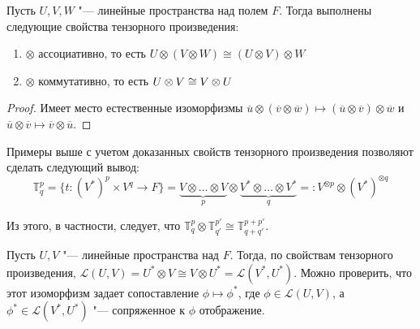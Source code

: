 \begin{proposition}
	Пусть $U, V, W$ "--- линейные пространства над полем $F$. Тогда выполнены следующие свойства тензорного произведения:
	\begin{enumerate}
		\item $\otimes$ ассоциативно, то есть $U \otimes (V \otimes W) \cong (U \otimes V) \otimes W$
		\item $\otimes$ коммутативно, то есть $U \otimes V \hm{\cong} V \otimes U$
	\end{enumerate}
\end{proposition}

\begin{proof}
	Имеет место естественные изоморфизмы $\overline{u} \otimes (\overline{v} \otimes \overline{w}) \mapsto (\overline{u} \otimes \overline{v}) \otimes \overline{w}$ и $\overline{u} \otimes \overline{v} \mapsto \overline{v} \otimes \overline{u}$.
\end{proof}

\begin{note}
	Примеры выше с учетом доказанных свойств тензорного произведения позволяют сделать следующий вывод:
	\[\mathbb{T}^p_q = \{t : (V^*)^p \times V^q \rightarrow F\} = \underbrace{V \otimes \dots \otimes V}_p \otimes \underbrace{V^* \otimes \dots \otimes V^*}_q =: V^{\otimes p} \otimes (V^*)^{\otimes q}\]
	
	Из этого, в частности, следует, что $\mathbb{T}^p_q \otimes \mathbb{T}^{p'}_{q'} \cong \mathbb{T}^{p + p'}_{q + q'}$.
\end{note}

\begin{example} 
	Пусть $U, V$ "--- линейные пространства над $F$. Тогда, по свойствам тензорного произведения, $\mathcal{L}(U, V) = U^* \otimes V \cong V \otimes U^* = \mathcal{L}(V^*, U^*)$. Можно проверить, что этот изоморфизм задает сопоставление $\phi \mapsto \phi^*$, где $\phi \in \mathcal{L}(U, V)$, а $\phi^* \in \mathcal{L}(V^*, U^*)$ "--- сопряженное к $\phi$ отображение.
\end{example}